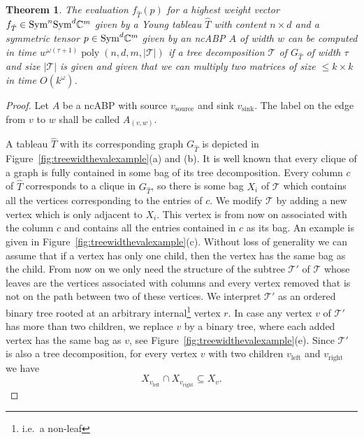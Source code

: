 \documentclass[10pt,a4paper]{article}
\numberwithin{equation}{section}
\newtheorem{theorem}[equation]{Theorem}
\theoremstyle{definition}
\newcommand{\Sym}{\textup{Sym}}
\newcommand{\IC}{\mathbb{C}}
\newcommand{\CT}{\mathcal{T}}
\DeclareMathOperator{\poly}{poly}
\begin{document}
\begin{theorem}
    \label{thm:evaltreewidth}
    The evaluation $f_{\hat T}(p)$ for a highest weight vector $f_{\hat T} \in \Sym^n\Sym^d \IC^m$ given by a Young tableau $\hat{T}$ with content $n \times d$ and  a symmetric tensor $p \in \Sym^d \IC^m$ given by an ncABP $A$ of width $w$ can be computed in time $w^{\omega(\tau+1)}\poly(n,d,m,|\CT|)$ if a tree decomposition $\CT$ of $G_{\hat{T}}$ of width $\tau$ and size $|\CT|$ is given and given that we can multiply two matrices of size $\leq k \times k$ in time $O(k^\omega)$.
\end{theorem}

\begin{proof}
Let $A$ be a ncABP with source $v_\text{source}$ and sink $v_\text{sink}$. The label on the edge from $v$ to $w$ shall be called $A_{(v,w)}$.

A tableau $\hat T$ with its corresponding graph $G_{\hat T}$ is depicted in Figure~\ref{fig:treewidthevalexample}(a) and (b).
It is well known that every clique of a graph is fully contained in some bag of its tree decomposition.
Every column $c$ of $\hat{T}$ corresponds to a clique in $G_{\hat{T}}$, so there is some bag $X_i$ of $\CT$ which contains all the vertices corresponding to the entries of $c$.
We modify $\CT$ by adding a new vertex which is only adjacent to $X_i$.
This vertex is from now on associated with the column $c$ and contains all the entries contained in $c$ as its bag.
An example is given in Figure~\ref{fig:treewidthevalexample}(c).
Without loss of generality we can assume that if a vertex has only one child, then the vertex has the same bag as the child.
From now on we only need the structure of the subtree $\CT'$ of $\CT$ whose leaves are the vertices associated with columns and every vertex removed that is not on the path between two of these vertices.
We interpret $\CT'$ as an ordered binary tree rooted at an arbitrary internal\footnote{i.e.\ a non-leaf} vertex $r$.
In case any vertex $v$ of $\CT'$ has more than two children, we replace $v$ by a binary tree, where each added vertex has the same bag as $v$, see Figure~\ref{fig:treewidthevalexample}(e).
Since $\CT'$ is also a tree decomposition, for every vertex $v$ with two children $v_\text{left}$ and $v_\text{right}$ we have
\begin{equation}\label{eq:treedecompinclusion}
X_{v_\text{left}} \cap X_{v_\text{right}}\subseteq X_v.
\end{equation}


\end{proof}
\end{document}
